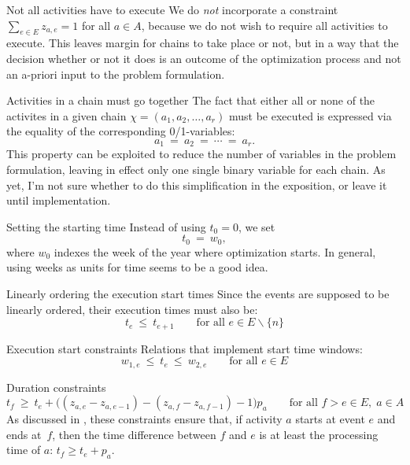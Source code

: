 \documentclass[11pt,reqno]{amsart}
\numberwithin{equation}{section}
\begin{document}
\begin{mydesc}

\item[Not all activities have to execute] We do \emph{not} incorporate a constraint
  $\sum_{e\in E} z_{a,e}=1$ for all $a\in A$, because we do not wish to require all
  activities to execute. This leaves margin for chains to take place or not, but in a way
  that the decision whether or not it does is an outcome of the optimization process and
  not an a-priori input to the problem formulation.

\item[Activities in a chain must go together] The fact that either all or none of the
  activites in a given chain $\chi=(a_1,a_2,\dots,a_r)$ must be executed is expressed via
  the equality of the corresponding 0/1-variables:
  \begin{equation}
    a_1 \ = \ a_2 \ = \ \cdots \ = \ a_r.
  \end{equation}
  This property can be exploited to reduce the number of variables in the problem
  formulation, leaving in effect only one single binary variable for each chain. As yet,
  I'm not sure whether to do this simplification in the exposition, or leave it until
  implementation. 

\item[Setting the starting time] Instead of using $t_0=0$, we set
  \begin{equation}
     t_0
     \ = \
     w_0,
  \end{equation}
  where $w_0$ indexes the week of the year where optimization starts. In general, using
  weeks as units for time seems to be a good idea.

\item[Linearly ordering the execution start times] Since the events are supposed to be linearly
  ordered,  their execution times must also be:
  \begin{equation}
     t_e 
     \ \le \
     t_{e+1}
     \qquad\text{for all }
      e\in E\smallsetminus\{n\}
  \end{equation}

\item[Execution start constraints] Relations that implement start time windows:
  \begin{equation}
    w_{1,e}\ \le\ t_e \ \le \ w_{2,e}
    \qquad\text{for all } e\in E
  \end{equation}
  

\item[Duration constraints]
  \begin{equation}
     t_f 
     \ \ge \
     t_e + \big((z_{a,e} - z_{a,e-1} ) - (z_{a,f} - z_{a,f-1}) - 1\big) p_a
     \qquad\text{for all } f>e\in E,\; a\in A
  \end{equation}
  As discussed in \cite{artigues-etal11}, these constraints ensure that,
if activity $a$ starts at event $e$ and ends at~$f$, then the time difference between  $f$
and $e$ is at least the processing time of $a$: $t_f \ge t_e + p_a$.


\end{mydesc}
\end{document}

